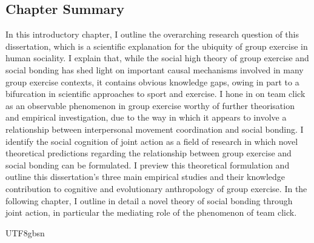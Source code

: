 \begin{CJK}{UTF8}{gbsn}
\subsection{Chapter Summary}
In this introductory chapter, I outline the overarching research question of this dissertation, which is a scientific explanation for the ubiquity of group exercise in human sociality.  I explain that, while the social high theory of group exercise and social bonding has shed light on important causal mechanisms involved in many group exercise contexts, it contains obvious knowledge gaps, owing in part to a bifurcation in scientific approaches to sport and exercise.  I hone in on team click as an observable phenomenon in group exercise worthy of further theorisation and empirical investigation, due to the way in which it appears to involve a relationship between interpersonal movement coordination and social bonding.  I identify the social cognition of joint action as a field of research in which novel theoretical predictions regarding the relationship between group exercise and social bonding can be formulated.  I preview this theoretical formulation and outline this dissertation's three main empirical studies and their knowledge contribution to cognitive and evolutionary anthropology of group exercise.  In the following chapter, I outline in detail a novel theory of social bonding through joint action, in particular the mediating role of the phenomenon of team click.





                                              \end{CJK}{UTF8}{gbsn}
